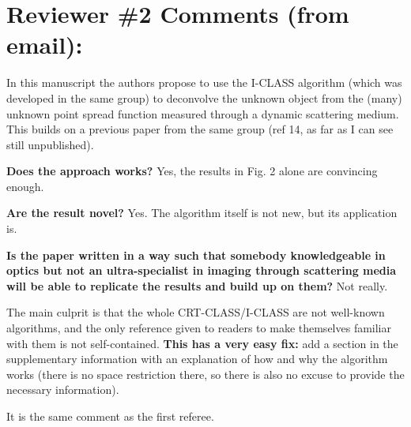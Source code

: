 \documentclass[12pt]{article}
\newenvironment{solved_reviewercomment}
    {\begin{tcolorbox}[width=\linewidth,colback=gray!5,colframe=solved_commentcolor!50,title=Reviewer Comment,left=5pt,right=5pt]}
    {\end{tcolorbox}}
\newenvironment{ourresponse}
    {\begin{tcolorbox}[width=\linewidth,breakable,enhanced,colback=gray!5,colframe=responsecolor!50,title=Response,left=5pt,right=5pt]}
    {\end{tcolorbox}}
\begin{document}
\newpage

\section{Reviewer \#2 Comments (from email):}

In this manuscript the authors propose to use the I-CLASS algorithm (which was developed in the same group) to deconvolve the unknown object from the (many) unknown point spread function measured through a dynamic scattering medium. This builds on a previous paper from the same group (ref 14, as far as I can see still unpublished).

\textbf{Does the approach works?} Yes, the results in Fig. 2 alone are convincing enough.

\textbf{Are the result novel?} Yes. The algorithm itself is not new, but its application is.

\textbf{Is the paper written in a way such that somebody knowledgeable in optics but not an ultra-specialist in imaging through scattering media will be able to replicate the results and build up on them?} Not really. 


    \begin{solved_reviewercomment}
        The main culprit is that the whole CRT-CLASS/I-CLASS are not well-known algorithms, and the only reference given to readers to make themselves familiar with them is not self-contained. \textbf{This has a very easy fix:} add a section in the supplementary information with an explanation of how and why the algorithm works (there is no space restriction there, so there is also no excuse to provide the necessary information).
    \end{solved_reviewercomment}
    \begin{ourresponse}
        It is the same comment as the first referee.
    \end{ourresponse}
\end{document}
